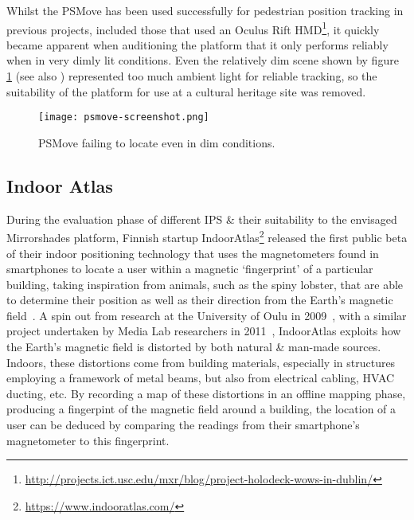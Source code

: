 Whilst the PSMove has been used successfully for pedestrian position tracking in previous projects, included those that used an Oculus Rift HMD\footnote{\url{http://projects.ict.usc.edu/mxr/blog/project-holodeck-wows-in-dublin/}}, it quickly became apparent when auditioning the platform that it only performs reliably when in very dimly lit conditions. Even the relatively dim scene shown by figure \ref{psmove-screenshot.png} (see also ) represented too much ambient light for reliable tracking, so the suitability of the platform for use at a cultural heritage site was removed.

\begin{figure}[h]
	\begin{center}
		\texttt{[image: psmove-screenshot.png]}
		\caption{PSMove failing to locate even in dim conditions.}
		\label{psmove-screenshot.png}
	\end{center}
\end{figure}


\subsection{Indoor Atlas}

During the evaluation phase of different IPS \& their suitability to the envisaged Mirrorshades platform, Finnish startup IndoorAtlas\footnote{\url{https://www.indooratlas.com/}} released the first public beta of their indoor positioning technology that uses the magnetometers found in smartphones to locate a user within a magnetic `fingerprint' of a particular building, taking inspiration from animals, such as the spiny lobster, that are able to determine their position as well as their direction from the Earth's magnetic field~\cite{Boles2003}. A spin out from research at the University of Oulu in 2009~\cite{Haverinen2009,Haverinen2009a}, with a similar project undertaken by Media Lab researchers in 2011~\cite{Chung2011}, IndoorAtlas exploits how the Earth's magnetic field is distorted by both natural \& man-made sources. Indoors, these distortions come from building materials, especially in structures employing a framework of metal beams, but also from electrical cabling, HVAC ducting, etc. By recording a map of these distortions in an offline mapping phase, producing a fingerpint of the magnetic field around a building, the location of a user can be deduced by comparing the readings from their smartphone's magnetometer to this fingerprint.

